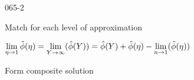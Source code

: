\begin{mitframe}{065-2}
\begin{listone}
\begin{listtwo}
\begin{listthree}
                    \end{listthree}
                \item Match for each level of approximation
                	\begin{listthree}
                    	\item $\lim\limits_{\intrinsvisc\rightarrow{1}}\tilde{\eleccoeff}(\intrinsvisc)=\lim\limits_{Y\rightarrow\infty}(\hat{\eleccoeff}(Y))=\hat{\eleccoeff}(Y)+\tilde{\eleccoeff}(\intrinsvisc)-\lim\limits_{n\rightarrow{1}}(\tilde{\eleccoeff}(\intrinsvisc))$
                    \end{listthree}
            \end{listtwo}
    \item  Form composite solution
\end{listone}      
\end{mitframe}